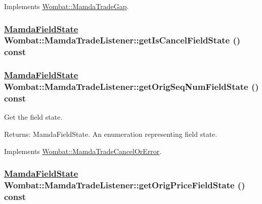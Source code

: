 Implements \hyperlink{classWombat_1_1MamdaTradeGap_9b5d0283e086dd58e28f871c756ddca5}{Wombat::Mamda\-Trade\-Gap}.\hypertarget{classWombat_1_1MamdaTradeListener_58e1fb7013e2858c0d870db1e31e9f3b}{
\subsubsection[getIsCancelFieldState]{\setlength{\rightskip}{0pt plus 5cm}\hyperlink{namespaceWombat_93aac974f2ab713554fd12a1fa3b7d2a}{Mamda\-Field\-State} Wombat::Mamda\-Trade\-Listener::get\-Is\-Cancel\-Field\-State () const}}
\label{classWombat_1_1MamdaTradeListener_58e1fb7013e2858c0d870db1e31e9f3b}


\hypertarget{classWombat_1_1MamdaTradeListener_0767574a3f0c34ae680fbbfadf296e0e}{
\subsubsection[getOrigSeqNumFieldState]{\setlength{\rightskip}{0pt plus 5cm}\hyperlink{namespaceWombat_93aac974f2ab713554fd12a1fa3b7d2a}{Mamda\-Field\-State} Wombat::Mamda\-Trade\-Listener::get\-Orig\-Seq\-Num\-Field\-State () const}}
\label{classWombat_1_1MamdaTradeListener_0767574a3f0c34ae680fbbfadf296e0e}


Get the field state. 

\begin{Desc}
\item[Returns:]Mamda\-Field\-State. An enumeration representing field state. \end{Desc}


Implements \hyperlink{classWombat_1_1MamdaTradeCancelOrError_fb7e94b42033b155bc02f70ed2756062}{Wombat::Mamda\-Trade\-Cancel\-Or\-Error}.\hypertarget{classWombat_1_1MamdaTradeListener_63ccde5fa2b5725b0b1c4efb0ef70880}{
\subsubsection[getOrigPriceFieldState]{\setlength{\rightskip}{0pt plus 5cm}\hyperlink{namespaceWombat_93aac974f2ab713554fd12a1fa3b7d2a}{Mamda\-Field\-State} Wombat::Mamda\-Trade\-Listener::get\-Orig\-Price\-Field\-State () const}}
\label{classWombat_1_1MamdaTradeListener_63ccde5fa2b5725b0b1c4efb0ef70880}


